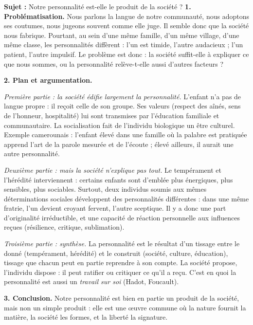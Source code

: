 \documentclass[11pt]{article}
\begin{document}
\begin{exoresolu}
\textbf{Sujet :} Notre personnalité est-elle le produit de la société ?
\tcblower
\textbf{1. Problématisation.} Nous parlons la langue de notre communauté, nous adoptons ses coutumes, nous jugeons souvent comme elle juge. Il semble donc que la société nous fabrique. Pourtant, au sein d'une même famille, d'un même village, d'une même classe, les personnalités diffèrent : l'un est timide, l'autre audacieux ; l'un patient, l'autre impulsif. Le problème est donc : la société suffit-elle à expliquer ce que nous sommes, ou la personnalité relève-t-elle aussi d'autres facteurs ?

\textbf{2. Plan et argumentation.}

\emph{Première partie : la société édifie largement la personnalité.} L'enfant n'a pas de langue propre : il reçoit celle de son groupe. Ses valeurs (respect des aînés, sens de l'honneur, hospitalité) lui sont transmises par l'éducation familiale et communautaire. La socialisation fait de l'individu biologique un être culturel. Exemple camerounais : l'enfant élevé dans une famille où la palabre est pratiquée apprend l'art de la parole mesurée et de l'écoute ; élevé ailleurs, il aurait une autre personnalité.

\emph{Deuxième partie : mais la société n'explique pas tout.} Le tempérament et l'hérédité interviennent : certains enfants sont d'emblée plus énergiques, plus sensibles, plus sociables. Surtout, deux individus soumis aux mêmes déterminations sociales développent des personnalités différentes : dans une même fratrie, l'un devient croyant fervent, l'autre sceptique. Il y a donc une part d'originalité irréductible, et une capacité de réaction personnelle aux influences reçues (résilience, critique, sublimation).

\emph{Troisième partie : synthèse.} La personnalité est le résultat d'un tissage entre le donné (tempérament, hérédité) et le construit (société, culture, éducation), tissage que chacun peut en partie reprendre à son compte. La société propose, l'individu dispose : il peut ratifier ou critiquer ce qu'il a reçu. C'est en quoi la personnalité est aussi un \emph{travail sur soi} (Hadot, Foucault).

\textbf{3. Conclusion.} Notre personnalité est bien en partie un produit de la société, mais non un simple produit : elle est une œuvre commune où la nature fournit la matière, la société les formes, et la liberté la signature.
\end{exoresolu}
\end{document}
